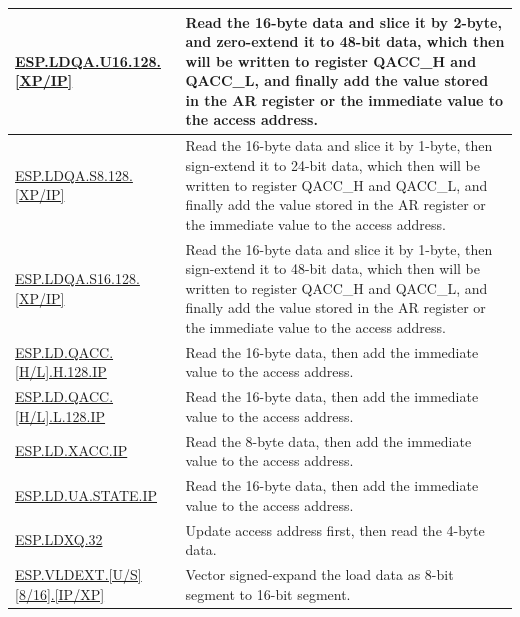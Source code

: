 \begin{longtable}[c]{|l|m{12cm}|}
    \\\hline
    \hyperref[instruction:ESPLDQAU16128XP]{ESP.LDQA.U16.128.[XP/IP]} & Read the 16-byte data and slice it by 2-byte, and zero-extend it to 48-bit data, which then will be written to register QACC\_H and QACC\_L, and finally add the value stored in the AR register or the immediate value to the access address.
    \\\hline
    \hyperref[instruction:ESPLDQAS8128XP]{ESP.LDQA.S8.128.[XP/IP]} & Read the 16-byte data and slice it by 1-byte, then sign-extend it to 24-bit data, which then will be written to register QACC\_H and QACC\_L, and finally add the value stored in the AR register or the immediate value to the access address.
    \\\hline
    \hyperref[instruction:ESPLDQAS16128XP]{ESP.LDQA.S16.128.[XP/IP]} & Read the 16-byte data and slice it by 1-byte, then sign-extend it to 48-bit data, which then will be written to register QACC\_H and QACC\_L, and finally add the value stored in the AR register or the immediate value to the access address.
    \\\hline
    \hyperref[instruction:ESPLDQACC_HH128IP]{ESP.LD.QACC.[H/L].H.128.IP} & Read the 16-byte data, then add the immediate value to the access address.
    \\\hline
    \hyperref[instruction:ESPLDQACC_HL128IP]{ESP.LD.QACC.[H/L].L.128.IP} & Read the 16-byte data, then add the immediate value to the access address.
    \\\hline
    \hyperref[instruction:ESPLDXACCIP]{ESP.LD.XACC.IP} & Read the 8-byte data, then add the immediate value to the access address.
    \\\hline
    \hyperref[instruction:ESPLDUA_STATEIP]{ESP.LD.UA.STATE.IP} & Read the 16-byte data, then add the immediate value to the access address.
    \\\hline
    \hyperref[instruction:ESPLDXQ32]{ESP.LDXQ.32} & Update access address first, then read the 4-byte data.
    \\\hline

    \hyperref[instruction:ESPVLDEXTU8IP]{ESP.VLDEXT.[U/S][8/16].[IP/XP]} & Vector signed-expand the load data as 8-bit segment to 16-bit segment.
    \\\hline
    
\end{longtable}
